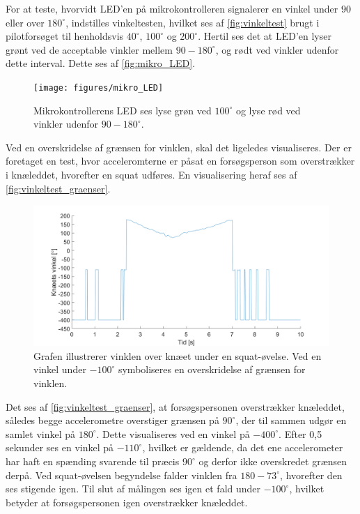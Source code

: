 For at teste, hvorvidt LED'en på mikrokontrolleren signalerer en vinkel under $90$ eller over $180^{\circ}$, indstilles vinkeltesten, hvilket ses af \autoref{fig:vinkeltest} brugt i pilotforsøget til henholdsvis $40^{\circ}$, $100^{\circ}$ og $200^{\circ}$. Hertil ses det at LED'en lyser grønt ved de acceptable vinkler mellem $90-180^{\circ}$, og rødt ved vinkler udenfor dette interval. Dette ses af \autoref{fig:mikro_LED}.

\begin{figure}[H]
\centering
\texttt{[image: figures/mikro\_LED]}
\caption{Mikrokontrollerens LED ses lyse grøn ved $100^{\circ}$ og lyse rød ved vinkler udenfor $90-180^{\circ}$.}
\label{fig:mikro_LED}
\end{figure}

\noindent
Ved en overskridelse af grænsen for vinklen, skal det ligeledes visualiseres. Der er foretaget en test, hvor acceleromterne er påsat en forsøgsperson som overstrækker i knæleddet, hvorefter en squat udføres. En visualisering heraf ses af \autoref{fig:vinkeltest_graenser}.

\begin{figure}[H]
\centering
\includegraphics[width=1\textwidth]{figures/vinkeltest_graenser}
\caption{Grafen illustrerer vinklen over knæet under en squat-øvelse. Ved en vinkel under $-100^{\circ}$ symboliseres en overskridelse af grænsen for vinklen.}
\label{fig:vinkeltest_graenser}
\end{figure}

\noindent
Det ses af \autoref{fig:vinkeltest_graenser}, at forsøgspersonen overstrækker knæleddet, således begge accelerometre overstiger grænsen på $90^{\circ}$, der til sammen udgør en samlet vinkel på $180^{\circ}$. Dette visualiseres ved en vinkel på $-400^{\circ}$. 
Efter 0,5 sekunder ses en vinkel på $-110^{\circ}$, hvilket er gældende, da det ene accelerometer har haft en spænding svarende til præcis $90^{\circ}$ og derfor ikke overskredet grænsen derpå. Ved squat-øvelsen begyndelse falder vinklen fra $180-73^{\circ}$, hvorefter den ses stigende igen. Til slut af målingen ses igen et fald under $-100^{\circ}$, hvilket betyder at forsøgspersonen igen overstrækker knæleddet.

